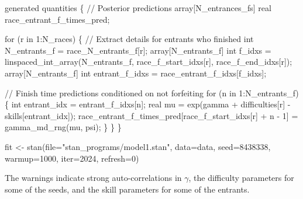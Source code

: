 \documentclass[
  letterpaper,
  DIV=11,
  numbers=noendperiod]{scrartcl}
\newenvironment{Shaded}{\begin{snugshade}}{\end{snugshade}}
\newcommand{\AttributeTok}[1]{\textcolor[rgb]{0.40,0.45,0.13}{#1}}
\newcommand{\CommentTok}[1]{\textcolor[rgb]{0.37,0.37,0.37}{#1}}
\newcommand{\ControlFlowTok}[1]{\textcolor[rgb]{0.00,0.23,0.31}{#1}}
\newcommand{\DataTypeTok}[1]{\textcolor[rgb]{0.68,0.00,0.00}{#1}}
\newcommand{\DecValTok}[1]{\textcolor[rgb]{0.68,0.00,0.00}{#1}}
\newcommand{\FunctionTok}[1]{\textcolor[rgb]{0.28,0.35,0.67}{#1}}
\newcommand{\KeywordTok}[1]{\textcolor[rgb]{0.00,0.23,0.31}{#1}}
\newcommand{\NormalTok}[1]{\textcolor[rgb]{0.00,0.23,0.31}{#1}}
\newcommand{\OtherTok}[1]{\textcolor[rgb]{0.00,0.23,0.31}{#1}}
\newcommand{\StringTok}[1]{\textcolor[rgb]{0.13,0.47,0.30}{#1}}
\begin{document}
\begin{codelisting}
\begin{Shaded}
\begin{Highlighting}[]
\KeywordTok{generated quantities}\NormalTok{ \{}
  \CommentTok{// Posterior predictions}
  \DataTypeTok{array}\NormalTok{[N\_entrances\_fs] }\DataTypeTok{real}\NormalTok{ race\_entrant\_f\_times\_pred;}

  \ControlFlowTok{for}\NormalTok{ (r }\ControlFlowTok{in} \DecValTok{1}\NormalTok{:N\_races) \{}
    \CommentTok{// Extract details for entrants who finished}
    \DataTypeTok{int}\NormalTok{ N\_entrants\_f = race\_N\_entrants\_f[r];}
    \DataTypeTok{array}\NormalTok{[N\_entrants\_f] }\DataTypeTok{int}\NormalTok{ f\_idxs = linspaced\_int\_array(N\_entrants\_f,}
\NormalTok{                                                         race\_f\_start\_idxs[r],}
\NormalTok{                                                         race\_f\_end\_idxs[r]);}
    \DataTypeTok{array}\NormalTok{[N\_entrants\_f] }\DataTypeTok{int}\NormalTok{ entrant\_f\_idxs = race\_entrant\_f\_idxs[f\_idxs];}

    \CommentTok{// Finish time predictions conditioned on not forfeiting}
    \ControlFlowTok{for}\NormalTok{ (n }\ControlFlowTok{in} \DecValTok{1}\NormalTok{:N\_entrants\_f) \{}
      \DataTypeTok{int}\NormalTok{ entrant\_idx = entrant\_f\_idxs[n];}
      \DataTypeTok{real}\NormalTok{ mu = exp(gamma + difficulties[r] {-} skills[entrant\_idx]);}
\NormalTok{      race\_entrant\_f\_times\_pred[race\_f\_start\_idxs[r] + n {-} }\DecValTok{1}\NormalTok{]}
\NormalTok{        = gamma\_md\_rng(mu, psi);}
\NormalTok{    \}}
\NormalTok{  \}}
\NormalTok{\}}
\end{Highlighting}
\end{Shaded}

\end{codelisting}

\begin{Shaded}
\begin{Highlighting}[]
\NormalTok{fit }\OtherTok{\textless{}{-}} \FunctionTok{stan}\NormalTok{(}\AttributeTok{file=}\StringTok{"stan\_programs/model1.stan"}\NormalTok{,}
            \AttributeTok{data=}\NormalTok{data, }\AttributeTok{seed=}\DecValTok{8438338}\NormalTok{,}
            \AttributeTok{warmup=}\DecValTok{1000}\NormalTok{, }\AttributeTok{iter=}\DecValTok{2024}\NormalTok{, }\AttributeTok{refresh=}\DecValTok{0}\NormalTok{)}
\end{Highlighting}
\end{Shaded}

The warnings indicate strong auto-correlations in \(\gamma\), the
difficulty parameters for some of the seeds, and the skill parameters
for some of the entrants.
\end{document}
